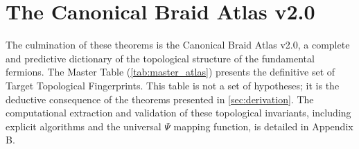 \documentclass[11pt]{article}
\theoremstyle{remark}
\begin{document}
\section{The Canonical Braid Atlas v2.0}
\label{sec:atlas}

The culmination of these theorems is the Canonical Braid Atlas v2.0, a complete and predictive dictionary of the topological structure of the fundamental fermions. The Master Table (\cref{tab:master_atlas}) presents the definitive set of Target Topological Fingerprints. This table is not a set of hypotheses; it is the deductive consequence of the theorems presented in \cref{sec:derivation}. The computational extraction and validation of these topological invariants, including explicit algorithms and the universal $\Psi$ mapping function, is detailed in Appendix B.
\end{document}
